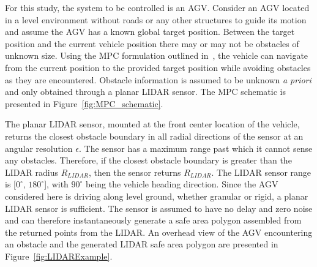 \documentclass[12pt,onecolumn]{report}
\begin{document}
For this study, the system to be controlled is an AGV. Consider an AGV located in a level environment without roads or any other structures to guide its motion and assume the AGV has a known global target position. Between the target position and the current vehicle position there may or may not be obstacles of unknown size. Using the MPC formulation outlined in~\cite{ModelFidelity2016}, the vehicle can navigate from the current position to the provided target position while avoiding obstacles as they are encountered. Obstacle information is assumed to be unknown \textit{a priori} and only obtained through a planar LIDAR sensor. The MPC schematic is presented in Figure~\ref{fig:MPC_schematic}.
%

The planar LIDAR sensor, mounted at the front center location of the vehicle, returns the closest obstacle boundary in all radial directions of the sensor at an angular resolution $\epsilon$. The sensor has a maximum range past which it cannot sense any obstacles. Therefore, if the closest obstacle boundary is greater than the LIDAR radius $R_{LIDAR}$, then the sensor returns $R_{LIDAR}$. The LIDAR sensor range is [$0^\circ$, $180^\circ$], with $90^\circ$ being the vehicle heading direction. Since the AGV considered here is driving along level ground, whether granular or rigid, a planar LIDAR sensor is sufficient. The sensor is assumed to have no delay and zero noise and can therefore instantaneously generate a safe area polygon assembled from the returned points from the LIDAR. An overhead view of the AGV encountering an obstacle and the generated LIDAR safe area polygon are presented in Figure~\ref{fig:LIDARExample}. 
%
\end{document}
